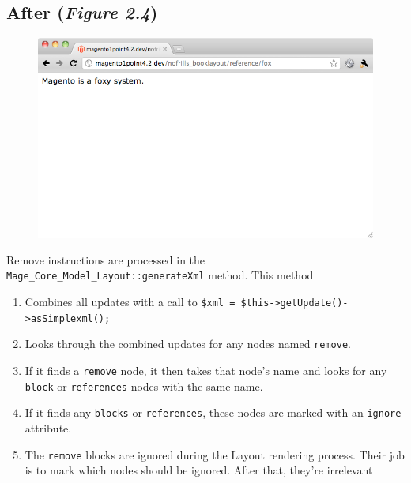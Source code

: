 \documentclass[oneside]{book}
\begin{document}
\subsection{After (\emph{Figure 2.4})}

\begin{figure}[htb]
\begin{center}
\leavevmode
\includegraphics[width=1\textwidth]{images/chapter2/after.png}
\end{center}
\caption{}
\end{figure}


Remove instructions are processed in the \footnotesize\texttt{Mage\_Core\_Model\_Layout::generateXml} \normalsize  method.  This method 

\begin{enumerate}
\item Combines all updates with a call to \footnotesize\texttt{\$xml = \$this-\textgreater getUpdate()-\textgreater asSimplexml();} \normalsize 
\item Looks through the combined updates for any nodes named \footnotesize\texttt{remove}\normalsize.
\item If it finds a \footnotesize\texttt{remove} \normalsize  node, it then takes that node's name and looks for any \footnotesize\texttt{block} \normalsize  or \footnotesize\texttt{references} \normalsize  nodes with the same name.  
\item If it finds any \footnotesize\texttt{blocks} \normalsize  or \footnotesize\texttt{references}\normalsize, these nodes are marked with an \footnotesize\texttt{ignore} \normalsize  attribute.
\item The \footnotesize\texttt{remove} \normalsize  blocks are ignored during the Layout rendering process.  Their job is to mark which nodes should be ignored.  After that, they're irrelevant
\end{enumerate}
\end{document}
